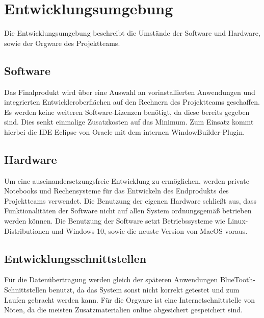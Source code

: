 \section{Entwicklungsumgebung}
Die Entwicklungsumgebung beschreibt die Umstände der Software und Hardware, sowie der Orgware des Projektteams.
\subsection{Software}
Das Finalprodukt wird über eine Auswahl an vorinstallierten Anwendungen und integrierten Entwickleroberflächen auf den Rechnern des Projektteams geschaffen. Es werden keine weiteren Software-Lizenzen benötigt, da diese bereits gegeben sind. Dies senkt einmalige Zusatzkosten auf das Minimum. Zum Einsatz kommt hierbei die IDE Eclipse von Oracle mit dem internen WindowBuilder-Plugin.
\subsection{Hardware}
Um eine auseinandersetzungsfreie Entwicklung zu ermöglichen, werden private Notebooks und Rechensysteme für das Entwickeln des Endprodukts des Projektteams verwendet. Die Benutzung der eigenen Hardware schließt aus, dass Funktionalitäten der Software nicht auf allen System ordnungsgemäß betrieben werden können. Die Benutzung der Software setzt Betriebssysteme wie Linux-Distributionen und Windows 10, sowie die neuste Version von MacOS voraus.
\subsection{Entwicklungsschnittstellen}
Für die Datenübertragung werden gleich der späteren Anwendungen BlueTooth-Schnittstellen benutzt, da das System sonst nicht korrekt getestet und zum Laufen gebracht werden kann. Für die Orgware ist eine Internetschnittstelle von Nöten, da die meisten Zusatzmaterialien online abgesichert gespeichert sind.